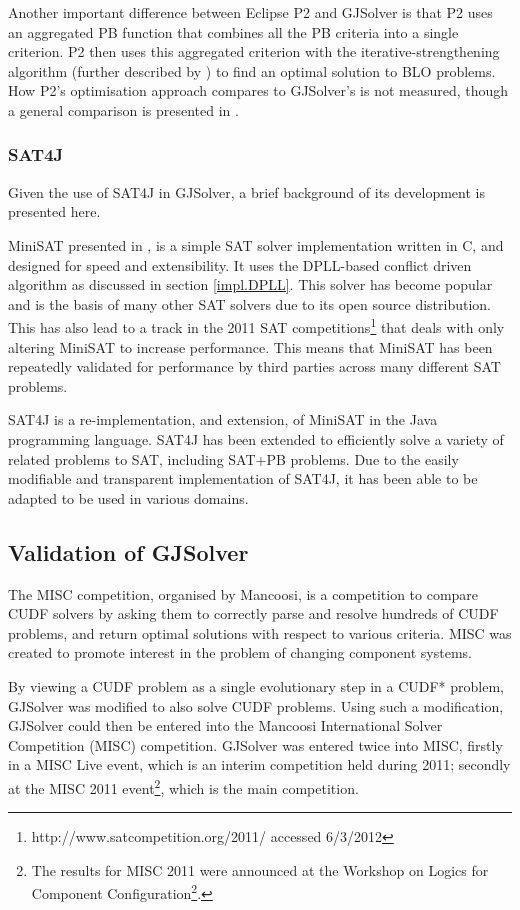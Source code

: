 Another important difference between Eclipse P2 and GJSolver is that P2 uses an aggregated PB function \citep{marque2011blex} that combines all the PB criteria into a single criterion.
P2 then uses this aggregated criterion with the iterative-strengthening algorithm (further described by \cite{leBerre2010}) to find an optimal solution to BLO problems.  
How P2's optimisation approach compares to GJSolver's is not measured, though a general comparison is presented in \cite{marque2011blex}.

\subsubsection{SAT4J}
Given the use of SAT4J in GJSolver, a brief background of its development is presented here.

MiniSAT presented in \citep{een2003}, is a simple SAT solver implementation written in C, and designed for speed and extensibility.
It uses the DPLL-based conflict driven algorithm as discussed in section \ref{impl.DPLL}.
This solver has become popular and is the basis of many other SAT solvers due to its open source distribution.
This has also lead to a track in the 2011 SAT competitions\footnote{http://www.satcompetition.org/2011/ accessed 6/3/2012} that deals with only altering MiniSAT to increase performance.
This means that MiniSAT has been repeatedly validated for performance by third parties across many different SAT problems. 

SAT4J \citep{le2010sat4j} is a re-implementation, and extension, of MiniSAT in the Java programming language.
SAT4J has been extended to efficiently solve a variety of related problems to SAT, including SAT+PB problems.
Due to the easily modifiable and transparent implementation of SAT4J, it has been able to be adapted to be used in various domains.

\subsection{Validation of GJSolver}
\label{impl.verif}
The MISC competition, organised by Mancoosi, is a competition to compare CUDF solvers by asking them to correctly parse and resolve hundreds of CUDF problems, 
and return optimal solutions with respect to various criteria.
MISC was created to promote interest in the problem of changing component systems.

By viewing a CUDF problem as a single evolutionary step in a CUDF* problem, GJSolver was modified to also solve CUDF problems.
Using such a modification, GJSolver could then be entered into the Mancoosi International Solver Competition (MISC) competition.
GJSolver was entered twice into MISC, firstly in a MISC Live event, which is an interim competition held during 2011;
secondly at the MISC 2011 event\footnote{The results for MISC 2011 were announced at the Workshop on Logics for Component Configuration\footnote{http://www.pps.jussieu.fr/~treinen/lococo/2011/ accessed 6/3/2012}.}, 
which is the main competition. 

